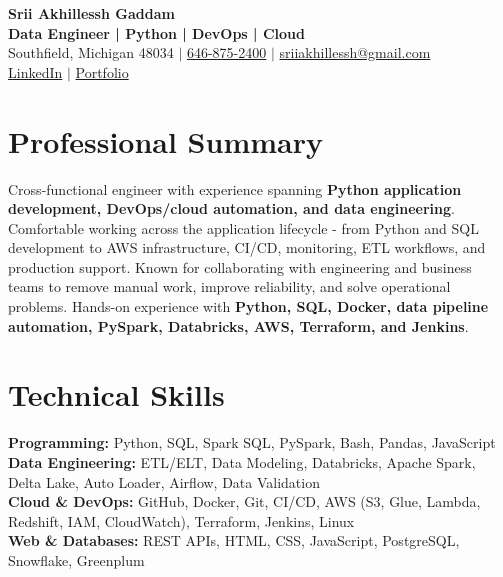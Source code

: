 \documentclass[letterpaper,10pt]{article}
\begin{document}
\fontsize{9.35pt}{10.45pt}\selectfont

\begin{center}
    {\LARGE \textbf{Srii Akhillessh Gaddam}} \\[-1pt]
    \textbf{Data Engineer | Python | DevOps | Cloud} \\[2pt]
    Southfield, Michigan 48034 $|$
    \href{tel:6468752400}{646-875-2400} $|$
    \href{mailto:sriiakhillessh@gmail.com}{sriiakhillessh@gmail.com} \\[1pt]
    \href{https://www.linkedin.com/in/srii-akhiilessh-gaddam-b48668191/}{LinkedIn} $|$
    \href{https://sriiakhillesshg.github.io/portfolio/}{Portfolio}
\end{center}
\vspace{-8pt}

\section{Professional Summary}
\small{Cross-functional engineer with experience spanning \textbf{Python application development, DevOps/cloud automation, and data engineering}. Comfortable working across the application lifecycle - from Python and SQL development to AWS infrastructure, CI/CD, monitoring, ETL workflows, and production support. Known for collaborating with engineering and business teams to remove manual work, improve reliability, and solve operational problems. Hands-on experience with \textbf{Python, SQL, Docker, data pipeline automation, PySpark, Databricks, AWS, Terraform, and Jenkins}.}

\section{Technical Skills}
\small{
\textbf{Programming:} Python, SQL, Spark SQL, PySpark, Bash, Pandas, JavaScript \\
\textbf{Data Engineering:} ETL/ELT, Data Modeling, Databricks, Apache Spark, Delta Lake, Auto Loader, Airflow, Data Validation \\
\textbf{Cloud \& DevOps:} GitHub, Docker, Git, CI/CD, AWS (S3, Glue, Lambda, Redshift, IAM, CloudWatch), Terraform, Jenkins, Linux \\
\textbf{Web \& Databases:} REST APIs, HTML, CSS, JavaScript, PostgreSQL, Snowflake, Greenplum
}

\end{document}
